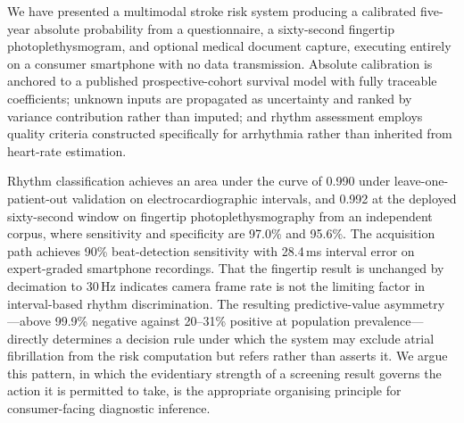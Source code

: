\documentclass[conference]{IEEEtran}
\begin{document}
We have presented a multimodal stroke risk system producing a calibrated five-year
absolute probability from a questionnaire, a sixty-second fingertip
photoplethysmogram, and optional medical document capture, executing entirely on a
consumer smartphone with no data transmission. Absolute calibration is anchored to
a published prospective-cohort survival model with fully traceable coefficients;
unknown inputs are propagated as uncertainty and ranked by variance contribution
rather than imputed; and rhythm assessment employs quality criteria constructed
specifically for arrhythmia rather than inherited from heart-rate estimation.

Rhythm classification achieves an area under the curve of 0.990 under
leave-one-patient-out validation on electrocardiographic intervals, and 0.992 at the
deployed sixty-second window on fingertip photoplethysmography from an independent
corpus, where sensitivity and specificity are 97.0\% and 95.6\%. The acquisition path
achieves 90\% beat-detection sensitivity with 28.4\,ms interval error on expert-graded
smartphone recordings. That the fingertip result is unchanged by decimation to 30\,Hz
indicates camera frame rate is not the limiting factor in interval-based rhythm
discrimination. The resulting predictive-value asymmetry---above 99.9\% negative against
20--31\% positive at population prevalence---directly determines a decision rule under
which the system may exclude atrial fibrillation from the risk computation but
refers rather than asserts it. We argue this pattern, in which the evidentiary
strength of a screening result governs the action it is permitted to take, is the
appropriate organising principle for consumer-facing diagnostic inference.
\end{document}
